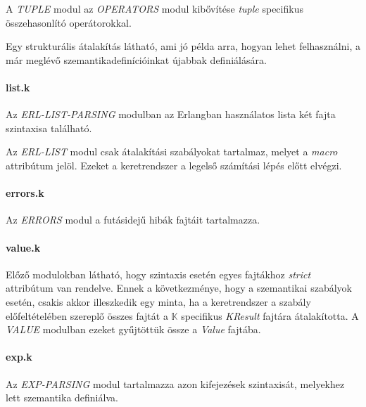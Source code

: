 

A \textit{TUPLE} modul az \textit{OPERATORS} modul kibővítése \textit{tuple} specifikus összehasonlító operátorokkal.



Egy strukturális átalakítás látható, ami jó példa arra, hogyan lehet felhasználni, a már meglévő szemantikadefinícióinkat újabbak definiálására.

\paragraph{list.k}

Az \textit{ERL-LIST-PARSING} modulban az Erlangban használatos lista két fajta szintaxisa található.



Az \textit{ERL-LIST} modul csak átalakítási szabályokat tartalmaz, melyet a \textit{macro} attribútum jelöl. Ezeket a keretrendszer a legelső számítási lépés előtt elvégzi.



\paragraph{errors.k}

Az \textit{ERRORS} modul a futásidejű hibák fajtáit tartalmazza.



\paragraph{value.k}

Előző modulokban látható, hogy szintaxis esetén egyes fajtákhoz \textit{strict} attribútum van rendelve. Ennek a következménye, hogy a szemantikai szabályok esetén, csakis akkor illeszkedik egy minta, ha a keretrendszer a szabály előfeltételében szereplő összes fajtát a $\mathbb{K}$ specifikus \textit{KResult} fajtára átalakította. A \textit{VALUE} modulban ezeket gyűjtöttük össze a \textit{Value} fajtába.



\paragraph{exp.k}

Az \textit{EXP-PARSING} modul tartalmazza azon kifejezések szintaxisát, melyekhez lett szemantika definiálva.

